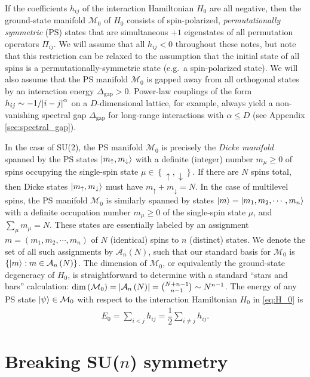 \documentclass[nofootinbib,notitlepage,11pt]{revtex4-2}
\renewcommand{\t}{\text} %
\newcommand{\f}[2]{\dfrac{#1}{#2}} %
\newcommand{\p}[1]{\left(#1\right)} %
\renewcommand{\set}[1]{\left\{#1\right\}} %
\newcommand{\1}{\mathds{1}}
\newcommand{\up}{\uparrow}
\newcommand{\dn}{\downarrow}
\newcommand{\A}{\mathcal{A}}
\newcommand{\M}{\mathcal{M}}
\begin{document}
If the coefficients $h_{ij}$ of the interaction Hamiltonian $H_0$ are
all negative, then the ground-state manifold $\M_0$ of $H_0$ consists
of spin-polarized, {\it permutationally symmetric} (PS) states that
are simultaneous $+1$ eigenstates of all permutation operators
$\Pi_{ij}$.  We will assume that all $h_{ij}<0$ throughout these
notes, but note that this restriction can be relaxed to the assumption
that the initial state of all spins is a permutationally-symmetric
state (e.g.~a spin-polarized state).  We will also assume that the PS
manifold $\M_0$ is gapped away from all orthogonal states by an
interaction energy $\Delta_{\t{gap}}>0$.  Power-law couplings of the
form $h_{ij}\sim-1/\abs{i-j}^\alpha$ on a $D$-dimensional lattice, for
example, always yield a non-vanishing spectral gap $\Delta_{\t{gap}}$
for long-range interactions with $\alpha\le D$ (see Appendix
\ref{sec:spectral_gap}).

In the case of SU(2), the PS manifold $\M_0$ is precisely the {\it
  Dicke manifold} spanned by the PS states $\ket{m_\up,m_\dn}$ with a
definite (integer) number $m_\mu\ge0$ of spins occupying the
single-spin state $\mu\in\set{\up,\dn}$.  If there are $N$ spins
total, then Dicke states $\ket{m_\up,m_\dn}$ must have
$m_\up+m_\dn=N$.  In the case of multilevel spins, the PS manifold
$\M_0$ is similarly spanned by states
$\ket{m}=\ket{m_1,m_2,\cdots,m_n}$ with a definite occupation number
$m_\mu\ge0$ of the single-spin state $\mu$, and $\sum_\mu m_\mu=N$.
These states are essentially labeled by an assignment
$m=\p{m_1,m_2,\cdots,m_n}$ of $N$ (identical) spins to $n$ (distinct)
states.  We denote the set of all such assignments by $\A_n\p{N}$,
such that our standard basis for $\M_0$ is
$\set{\ket{m}:m\in\A_n\p{N}}$.  The dimension of $\M_0$, or
equivalently the ground-state degeneracy of $H_0$, is straightforward
to determine with a standard ``stars and bars'' calculation:
$\dim\p{\M_0}=\abs{\A_n\p{N}} = {N+n-1 \choose n-1} \sim N^{n-1}$.
The energy of any PS state $\ket\psi\in\M_0$ with respect to the
interaction Hamiltonian $H_0$ in \eqref{eq:H_0} is
\begin{align}
  E_0 = \sum_{i<j} h_{ij} = \f12 \sum_{i\ne j} h_{ij}.
\end{align}

\section{Breaking SU($n$) symmetry}
\label{sec:breaking_sun}
\end{document}
